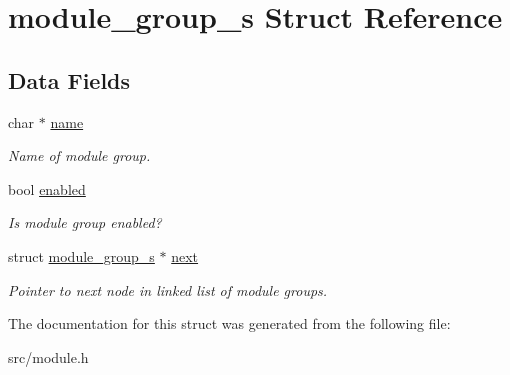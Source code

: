 \hypertarget{structmodule__group__s}{}\section{module\+\_\+group\+\_\+s Struct Reference}
\label{structmodule__group__s}
\subsection*{Data Fields}
\begin{DoxyCompactItemize}
\item 
\mbox{\label{structmodule__group__s_a8627e7213a51906ada3018b77f4fb925}} 
char $\ast$ \hyperlink{structmodule__group__s_a8627e7213a51906ada3018b77f4fb925}{name}
\begin{DoxyCompactList}\small\item\em Name of module group. \end{DoxyCompactList}\item 
\mbox{\label{structmodule__group__s_a6d69971508f1de70b11ed55d4d9361af}} 
bool \hyperlink{structmodule__group__s_a6d69971508f1de70b11ed55d4d9361af}{enabled}
\begin{DoxyCompactList}\small\item\em Is module group enabled? \end{DoxyCompactList}\item 
\mbox{\label{structmodule__group__s_a7e471a6467211415ed4aaae459c94869}} 
struct \hyperlink{structmodule__group__s}{module\+\_\+group\+\_\+s} $\ast$ \hyperlink{structmodule__group__s_a7e471a6467211415ed4aaae459c94869}{next}
\begin{DoxyCompactList}\small\item\em Pointer to next node in linked list of module groups. \end{DoxyCompactList}\end{DoxyCompactItemize}


The documentation for this struct was generated from the following file\+:\begin{DoxyCompactItemize}
\item 
src/module.\+h\end{DoxyCompactItemize}
